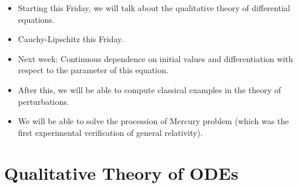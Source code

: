 \documentclass[../notes.tex]{subfiles}
\begin{document}
\begin{itemize}
    \item Starting this Friday, we will talk about the qualitative theory of differential equations.
    \item Cauchy-Lipschitz this Friday.
    \item Next week: Continuous dependence on initial values and differentiation with respect to the parameter of this equation.
    \item After this, we will be able to compute classical examples in the theory of perturbations.
    \item We will be able to solve the procession of Mercury problem (which was the first experimental verification of general relativity).
\end{itemize}



\section{Qualitative Theory of ODEs}
\end{document}
